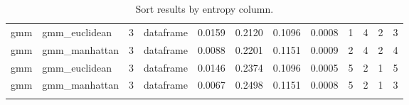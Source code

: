 \begin{itemize}
{\begin{longtable}{| p{1cm} | p{1.8cm} | p{0.7cm} | p{0.9cm} | p{0.5cm} | p{0.65cm} | p{0.5cm} | p{0.5cm} | p{0.55cm} | p{0.55cm} | p{0.6cm} | p{0.5cm} |}
\cline{2-12}
\scriptsize      gmm     & \scriptsize  gmm\_euclidean & \scriptsize    3     & \scriptsize dataframe & \scriptsize    0.0159    & \scriptsize 0.2120  & \scriptsize 0.1096 & \scriptsize    0.0008    & \scriptsize        1         & \scriptsize     4       & \scriptsize      2    & \scriptsize        3 \\
\cline{2-12}
\scriptsize      gmm     & \scriptsize  gmm\_manhattan & \scriptsize    3     & \scriptsize dataframe & \scriptsize    0.0088    & \scriptsize 0.2201  & \scriptsize 0.1151 & \scriptsize    0.0009    & \scriptsize        2         & \scriptsize     4       & \scriptsize      2    & \scriptsize        4 \\
\cline{2-12}
\scriptsize      gmm     & \scriptsize  gmm\_euclidean & \scriptsize    3     & \scriptsize dataframe & \scriptsize    0.0146    & \scriptsize 0.2374  & \scriptsize 0.1096 & \scriptsize    0.0005    & \scriptsize        5         & \scriptsize     2       & \scriptsize      1    & \scriptsize        5 \\
\cline{2-12}
\scriptsize      gmm     & \scriptsize  gmm\_manhattan & \scriptsize    3     & \scriptsize dataframe & \scriptsize    0.0067    & \scriptsize 0.2498  & \scriptsize 0.1151 & \scriptsize    0.0008    & \scriptsize        5         & \scriptsize     2       & \scriptsize      1    & \scriptsize        3 \\
\hline
\caption{Sort results by entropy column.}
\label{tab:resultsorting}
\end{longtable}}


\end{itemize}
